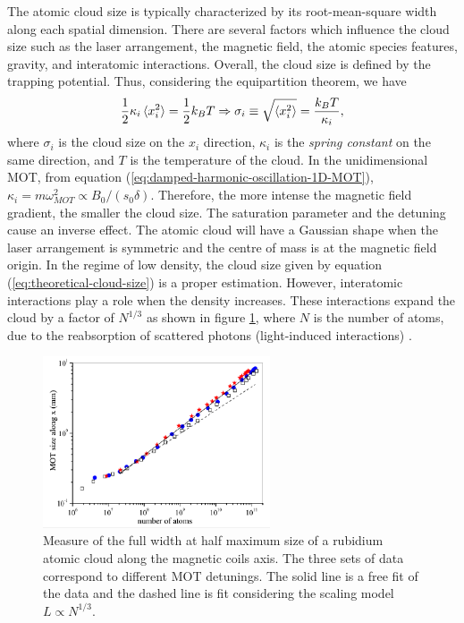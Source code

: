 The atomic cloud size is typically characterized by its root-mean-square width along each spatial dimension. There are several factors which influence the cloud size such as the laser arrangement, the magnetic field, the atomic species features, gravity, and interatomic interactions. Overall, the cloud size is defined by the trapping potential. Thus, considering the equipartition theorem, we have
\begin{equation}
	\frac{1}{2} \kappa_{i} \braket{x_i^2} = \frac{1}{2}k_B T
	\Rightarrow \sigma_{i} \equiv \sqrt{\braket{x_i^2}} = \frac{k_B T}{\kappa_{i}} ,
	\label{eq:theoretical-cloud-size}
\end{equation}
where $ \sigma_{i} $ is the cloud size on the $ x_i $ direction, $ \kappa_{i} $ is the \textit{spring constant} on the same direction, and $ T $ is the temperature of the cloud. In the unidimensional MOT, from equation (\ref{eq:damped-harmonic-oscillation-1D-MOT}), $ \kappa_{i} = m\omega_{MOT}^2 \propto B_0 / (s_0 \delta)$. Therefore, the more intense the magnetic field gradient, the smaller the cloud size. The saturation parameter and the detuning cause an inverse effect. The atomic cloud will have a Gaussian shape when the laser arrangement is symmetric and the centre of mass is at the magnetic field origin. In the regime of low density, the cloud size given by equation (\ref{eq:theoretical-cloud-size}) is a proper estimation. However, interatomic interactions play a role when the density increases. These interactions expand the cloud by a factor of $ N^{1/3} $ as shown in figure \ref{fig:cloud-size-scaling}, where $ N $ is the number of atoms, due to the reabsorption of scattered photons (light-induced interactions) \cite{PhysRevA.90.063404}.

\begin{figure}[!ht]
    \centering
    \includegraphics[width=0.6\textwidth]{USPSC-img/atomic-cloud-size-scaling.png}
    \caption{Measure of the full width at half maximum size of a rubidium atomic cloud along the magnetic coils axis. The three sets of data correspond to different MOT detunings. The solid line is a free fit of the data and the dashed line is fit considering the scaling model $ L \propto N^{1/3} $.}
    \label{fig:cloud-size-scaling}
\end{figure}


